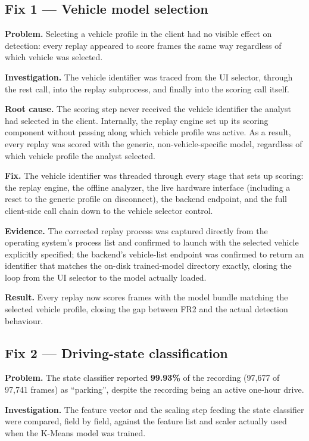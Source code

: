 \subsection{Fix 1 — Vehicle model selection}

\textbf{Problem.} Selecting a vehicle profile in the client had no visible effect on detection: every replay appeared to score frames the same way regardless of which vehicle was selected.

\textbf{Investigation.} The vehicle identifier was traced from the UI selector, through the \gls{rest} call, into the replay subprocess, and finally into the scoring call itself.

\textbf{Root cause.} The scoring step never received the vehicle identifier the analyst had selected in the client. Internally, the replay engine set up its scoring component without passing along which vehicle profile was active. As a result, every replay was scored with the generic, non-vehicle-specific model, regardless of which vehicle profile the analyst selected.

\textbf{Fix.} The vehicle identifier was threaded through every stage that sets up scoring: the replay engine, the offline analyzer, the live hardware interface (including a reset to the generic profile on disconnect), the backend endpoint, and the full client-side call chain down to the vehicle selector control.

\textbf{Evidence.} The corrected replay process was captured directly from the operating system's process list and confirmed to launch with the selected vehicle explicitly specified; the backend's vehicle-list endpoint was confirmed to return an identifier that matches the on-disk trained-model directory exactly, closing the loop from the UI selector to the model actually loaded.

\textbf{Result.} Every replay now scores frames with the model bundle matching the selected vehicle profile, closing the gap between FR2 and the actual detection behaviour.

\subsection{Fix 2 — Driving-state classification}
\label{sec:fix2}

\textbf{Problem.} The state classifier reported \textbf{99.93\%} of the recording (97{,}677 of 97{,}741 frames) as ``parking'', despite the recording being an active one-hour drive.

\textbf{Investigation.} The feature vector and the scaling step feeding the state classifier were compared, field by field, against the feature list and scaler actually used when the K-Means model was trained.

